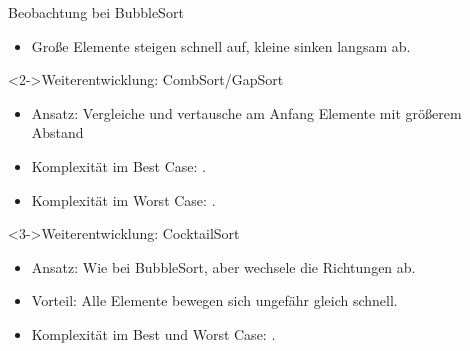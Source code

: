 \begin{frame}
    \begin{block}{Beobachtung bei BubbleSort}
        \begin{itemize}
            \item Große Elemente steigen schnell auf, kleine sinken langsam ab.
        \end{itemize}
    \end{block}
    \begin{block}<2->{Weiterentwicklung: CombSort/GapSort}
        \begin{itemize}
            \item Ansatz: Vergleiche und vertausche am Anfang Elemente mit größerem Abstand
            \item Komplexität im Best Case: \alert{\onlog}.
            \item Komplexität im Worst Case: \alert{\osquare}.
        \end{itemize}
    \end{block}
    \begin{block}<3->{Weiterentwicklung: CocktailSort}
        \begin{itemize}
            \item Ansatz: Wie bei BubbleSort, aber wechsele die Richtungen ab.
            \item Vorteil: Alle Elemente bewegen sich ungefähr gleich schnell.
            \item Komplexität im Best und Worst Case: \alert{\osquare}.
        \end{itemize}
    \end{block}
\end{frame}
